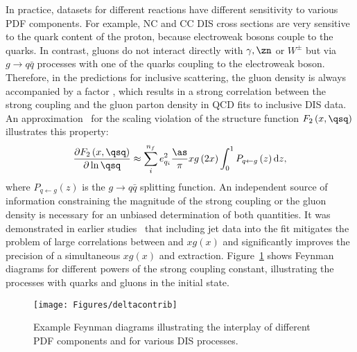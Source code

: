 In practice, datasets for different reactions have different sensitivity to various PDF components. For example, NC and CC DIS cross sections are very sensitive to the quark content of the proton, because electroweak bosons couple to the quarks. In contrast, gluons do not interact directly with $\gamma,\zn$ or $W^{\pm}$ but via $g\rightarrow q\bar q$ processes with one of the quarks coupling to the electroweak boson. Therefore, in the predictions for inclusive \ep scattering, the gluon density is always accompanied by a factor \as, which results in a strong correlation between the strong coupling and the gluon parton density in QCD fits to inclusive DIS data. An approximation~\cite{Prytz:1993vr} for the scaling violation of the structure function $F_2\left(x,\qsq \right)$ illustrates this property:
\begin{equation}
 \frac{\partial F_2\left(x,\qsq \right)}{\partial \ln \qsq} \approx \sum_i^{n_f}e_{q_i}^2 \frac{\as}{\pi} xg\left(2x\right) \int_0^1 P_{q\leftarrow g}\left(z\right)\mathrm{d}z, 
\end{equation}
where $P_{q\leftarrow g}\left(z\right)$ is the $g\rightarrow q\bar q$ splitting function. An independent source of information constraining the magnitude of the strong coupling or the gluon density is necessary for an unbiased determination of both quantities. It was demonstrated in earlier studies~\cite{Chekanov:2005nn,upub:herapdf1.7} that including jet data into the fit mitigates the problem of large correlations between \as and $xg\left(x\right)$ and significantly improves the precision of a simultaneous $xg\left(x\right)$ and \as extraction. Figure~\ref{fig:pdfcontributions} shows Feynman diagrams for different powers of the strong coupling constant, illustrating the processes with quarks and gluons in the initial state.
\begin{figure}[htp]
 \centering
 \begin{center}
 \texttt{[image: Figures/deltacontrib]}
\end{center}
 \caption{Example Feynman diagrams illustrating the interplay of different PDF components and \as for various DIS processes.}
 \label{fig:pdfcontributions}
\end{figure}
